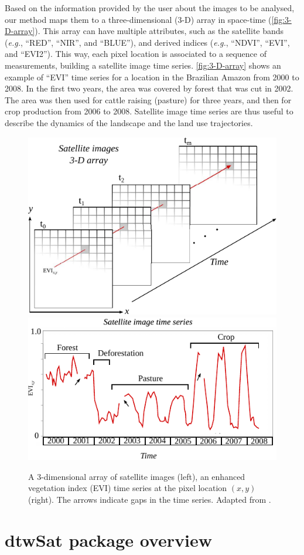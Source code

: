\documentclass[article,shortnames]{jss}
\begin{document}
Based on the information provided by the user about the images to be
analysed, our method maps them to a three-dimensional (3-D) array in
space-time (\autoref{fig:3-D-array}). This array can have multiple
attributes, such as the satellite bands (\emph{e.g.}, ``RED'', ``NIR'',
and ``BLUE''), and derived indices (\emph{e.g.}, ``NDVI'', ``EVI'', and
``EVI2''). This way, each pixel location is associated to a sequence of
measurements, building a satellite image time series.
\autoref{fig:3-D-array} shows an example of ``EVI'' time series for a
location in the Brazilian Amazon from 2000 to 2008. In the first two
years, the area was covered by forest that was cut in 2002. The area was
then used for cattle raising (pasture) for three years, and then for
crop production from 2006 to 2008. Satellite image time series are thus
useful to describe the dynamics of the landscape and the land use
trajectories.

\begin{figure}[!h]
\begin{center} 
  \includegraphics[width=.49\textwidth]{images_array.pdf}
  \includegraphics[width=.49\textwidth]{images_ts.pdf}
\end{center}
\caption{A 3-dimensional array of satellite images (left), an enhanced vegetation index (EVI) time series at the pixel location $(x,y)$ (right). The arrows indicate gaps in the time series. Adapted from \citet{Maus:2016}.}
\label{fig:3-D-array}
\end{figure}

\hypertarget{dtwsat-package-overview}{%
\section{dtwSat package overview}\label{dtwsat-package-overview}}
\end{document}
